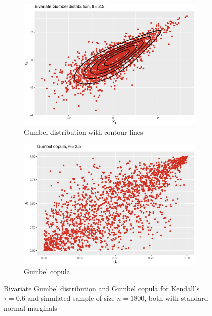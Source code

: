  \begin{figure}[H]
\centering
\begin{subfigure}{.45\textwidth}
  \centering
  \includegraphics[width=\linewidth]{figures/bivariate_gumbel.eps}
  \caption{Gumbel distribution with contour lines}
  \label{fig:bivariate_gumbel}
\end{subfigure}
\begin{subfigure}{.45\textwidth}
  \centering
  \includegraphics[width=\linewidth]{figures/gumbel_copula.eps}
  \caption{Gumbel copula}
  \label{fig:gumbel_copula}
\end{subfigure}
\caption{Bivariate Gumbel distribution and Gumbel copula for Kendall's $\tau = 0.6$ and simulated sample of size $n = 1800$, both with standard normal marginals}
\label{fig:gumbel_plots}
\end{figure}



